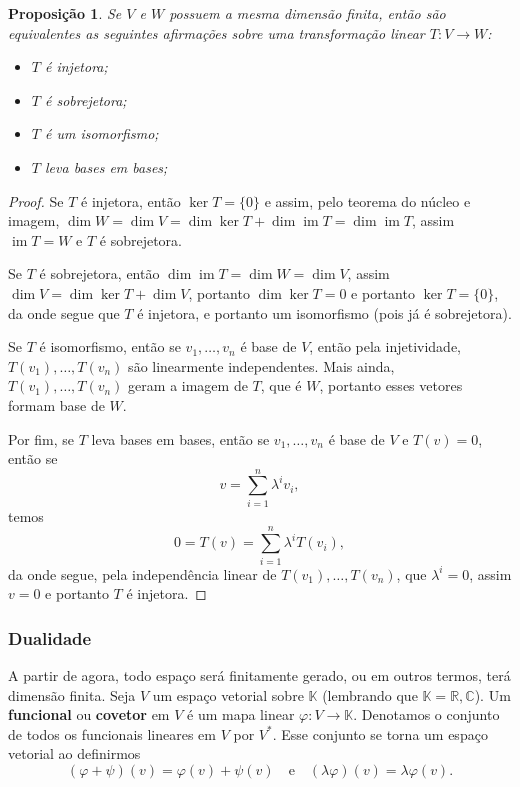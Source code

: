 \documentclass{article}
\newtheorem{proposition}[definition]{Proposição}
\DeclareMathOperator{\im}{im}
\renewcommand{\phi}{\varphi}
\begin{document}
\begin{proposition}\label{prop12}
    Se $V$ e $W$ possuem a mesma dimensão finita, então são equivalentes as seguintes afirmações sobre uma transformação linear $T \colon V \to W$: \begin{itemize}
        \item $T$ é injetora;
        \item $T$ é sobrejetora;
        \item $T$ é um isomorfismo;
        \item $T$ leva bases em bases;
    \end{itemize}
\end{proposition}
\begin{proof}
    Se $T$ é injetora, então $\ker T = \{0\}$ e assim, pelo teorema do núcleo e imagem, $\dim W = \dim V = \dim \ker T + \dim \im T = \dim \im T$, assim $\im T = W$ e $T$ é sobrejetora.

    Se $T$ é sobrejetora, então $\dim \im T = \dim W = \dim V$, assim $\dim V = \dim \ker T + \dim V$, portanto $\dim \ker T = 0$ e portanto $\ker T = \{0\}$, da onde segue que $T$ é injetora, e portanto um isomorfismo (pois já é sobrejetora).

    Se $T$ é isomorfismo, então se $v_1, \dots, v_n$ é base de $V$, então pela injetividade, $T(v_1), \dots, T(v_n)$ são linearmente independentes. Mais ainda, $T(v_1), \dots, T(v_n)$ geram a imagem de $T$, que é $W$, portanto esses vetores formam base de $W$.

    Por fim, se $T$ leva bases em bases, então se $v_1, \dots, v_n$ é base de $V$ e $T(v) = 0$, então se \begin{equation}
        v = \sum_{i = 1}^n \lambda^i v_i,
    \end{equation} temos \begin{equation}
        0 = T(v) = \sum_{i = 1}^n \lambda^i T(v_i),
    \end{equation} da onde segue, pela independência linear de $T(v_1), \dots, T(v_n)$, que $\lambda^i = 0$, assim $v = 0$ e portanto $T$ é injetora.
\end{proof}

\subsubsection*{Dualidade}

A partir de agora, todo espaço será finitamente gerado, ou em outros termos, terá dimensão finita. Seja $V$ um espaço vetorial sobre $\mathbb{K}$ (lembrando que $\mathbb{K} = \mathbb{R}, \mathbb{C}$). Um \textbf{funcional} ou \textbf{covetor} em $V$ é um mapa linear $\phi \colon V \to \mathbb{K}$. Denotamos o conjunto de todos os funcionais lineares em $V$ por $V^*$. Esse conjunto se torna um espaço vetorial ao definirmos \begin{equation}
    (\phi + \psi)(v) = \phi(v) + \psi(v) \quad \text{e} \quad (\lambda \phi)(v) = \lambda \phi(v).
\end{equation}
\end{document}
